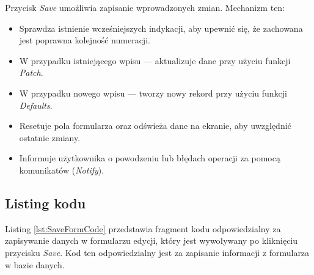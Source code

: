 Przycisk \textit{Save} umożliwia zapisanie wprowadzonych zmian. Mechanizm ten:

\begin{itemize}
\item Sprawdza istnienie wcześniejszych indykacji, aby upewnić się, że zachowana jest poprawna kolejność numeracji.
\item W przypadku istniejącego wpisu — aktualizuje dane przy użyciu funkcji \textit{Patch}.
\item W przypadku nowego wpisu — tworzy nowy rekord przy użyciu funkcji \textit{Defaults}.
\item Resetuje pola formularza oraz odświeża dane na ekranie, aby uwzględnić ostatnie zmiany.
\item Informuje użytkownika o powodzeniu lub błędach operacji za pomocą komunikatów (\textit{Notify}).
\end{itemize}

\subsection{Listing kodu}

Listing \ref{lst:SaveFormCode} przedstawia fragment kodu odpowiedzialny za zapisywanie danych w formularzu edycji, który jest wywoływany po kliknięciu przycisku \textit{Save}. Kod ten odpowiedzialny jest za zapisanie informacji z formularza w bazie danych.

